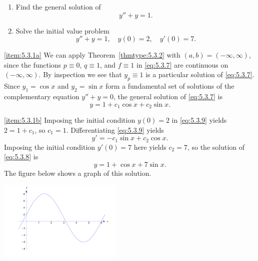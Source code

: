 \documentclass{ximera}
\begin{document}
\begin{example}\label{example:5.3.1}
\begin{enumerate}
\item \label{item:5.3.1a} %
Find the general solution of
\begin{equation} \label{eq:5.3.7}
y''+y=1.
\end{equation}
\item \label{item:5.3.1b} %
Solve the initial value problem
\begin{equation} \label{eq:5.3.8}
y''+y=1, \quad  y(0)=2,\quad y'(0)=7.
\end{equation}
\end{enumerate}
 
 
\begin{explanation} \ref{item:5.3.1a}
We can apply Theorem~\ref{thmtype:5.3.2} with $(a,b)= (-\infty,\infty)$,
since the functions $p\equiv0$, $q\equiv1$, and $f\equiv1$ in
\eqref{eq:5.3.7} are continuous on $(-\infty,\infty)$. By inspection we
see that $y_p\equiv1$ is a particular solution of \eqref{eq:5.3.7}. Since
$y_1=\cos x$ and $y_2=\sin x$ form a fundamental set of solutions of
the complementary equation $y''+y=0$, the general solution of
\eqref{eq:5.3.7} is
\begin{equation} \label{eq:5.3.9}
y=1+c_1\cos x+c_2\sin x.
\end{equation}
 
\ref{item:5.3.1b}
Imposing the initial condition $y(0)=2$ in \eqref{eq:5.3.9} yields
$2=1+c_1$, so $c_1=1$. Differentiating \eqref{eq:5.3.9} yields
$$
y'=-c_1\sin x+c_2\cos x.
$$
Imposing the initial condition $y'(0)=7$ here yields $c_2=7$,
so the solution of \eqref{eq:5.3.8} is
$$
y=1+\cos x+7\sin x.
$$
The figure below shows a graph of this solution.
 
 
\begin{image}
  \includegraphics[height=1.5in]{fig050301.jpg}
\end{image}
 
\end{explanation}
\end{example}
 
\end{document}
